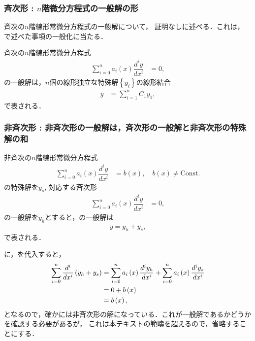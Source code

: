 \subsubsection{斉次形 : $n$階微分方程式の一般解の形}
%
斉次の$n$階線形常微分方程式の一般解について，
証明なしに述べる．これは，
で述べた事項の一般化に当たる．
%
\begin{shadebox}
 斉次の$n$階線形常微分方程式
\begin{align}
 \sum_{i=0}^{n}a_{i}\left(x\right)\dfrac{d^{i}y}{dx^{i}}& =0, 
\end{align}
の一般解は，$n$個の線形独立な特殊解$\left\{y_i\right\}$の線形結合
\begin{align}
  y & =\sum_{i=1}^{n}C_{1}y_{1},
\end{align} 
で表される．
\end{shadebox}

\subsubsection{非斉次形 : 非斉次形の一般解は，斉次形の一般解と非斉次形の特殊解の和\label{sec:inhomo_strategy}}
\begin{shadebox}
非斉次の$n$階線形常微分方程式
\begin{align}
 \sum_{i=0}^{n}a_{i}\left(x\right)\dfrac{d^{i}y}{dx^{i}} & =b\left(x\right), \quad b\left(x\right) \neq \mathrm{Const.}
\label{eq:inhomo_linear}
\end{align}
の特殊解を$y_s$, 対応する斉次形
\begin{align}
 \sum_{i=0}^{n}a_{i}\left(x\right)\dfrac{d^{i}y}{dx^{i}} & = 0,
\end{align}
の一般解を$y_h$とすると，の一般解は
\begin{align}
  y = y_{h} + y_{s}, \label{eq:inhomo_linear_sol}
\end{align}
で表される．
\end{shadebox}
%
に，を代入すると，
\begin{align}
 \sum_{i=0}^{n}\dfrac{d^{i}}{dx^{i}}\left(y_{h}+y_{s}\right) & =\sum_{i=0}^{n}a_{i}\left(x\right)\dfrac{d^{i}y_{h}}{dx^{i}}+\sum_{i=0}^{n}a_{i}\left(x\right)\dfrac{d^{i}y_{s}}{dx^{i}}\notag\\
 & =0+b\left(x\right)\notag\\
 & =b\left(x\right), 
\end{align}
となるので，確かには非斉次形の解になっている．これが一般解であるかどうかを確認する必要があるが，
これは本テキストの範疇を超えるので，省略することにする．

